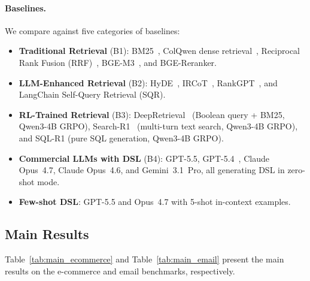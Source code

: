 \documentclass[11pt]{article}
\begin{document}
\paragraph{Baselines.}
We compare against five categories of baselines:

\begin{itemize}[leftmargin=*,nosep]
\item \textbf{Traditional Retrieval} (B1): BM25~\cite{robertson2009probabilistic}, ColQwen dense retrieval~\cite{chen2024colqwen}, Reciprocal Rank Fusion (RRF)~\cite{cormack2009reciprocal}, BGE-M3~\cite{chen2024bge}, and BGE-Reranker.
\item \textbf{LLM-Enhanced Retrieval} (B2): HyDE~\cite{gao2023precise}, IRCoT~\cite{trivedi2023interleaving}, RankGPT~\cite{sun2023chatgpt}, and LangChain Self-Query Retrieval (SQR).
\item \textbf{RL-Trained Retrieval} (B3): DeepRetrieval~\cite{jiang2025deepretrieval} (Boolean query + BM25, Qwen3-4B GRPO), Search-R1~\cite{jin2025search} (multi-turn text search, Qwen3-4B GRPO), and SQL-R1 (pure SQL generation, Qwen3-4B GRPO).
\item \textbf{Commercial LLMs with DSL} (B4): GPT-5.5, GPT-5.4~\cite{openai2025gpt5}, Claude Opus~4.7, Claude Opus~4.6, and Gemini~3.1~Pro, all generating DSL in zero-shot mode.
\item \textbf{Few-shot DSL}: GPT-5.5 and Opus~4.7 with 5-shot in-context examples.
\end{itemize}


\subsection{Main Results}
\label{sec:main_results}

Table~\ref{tab:main_ecommerce} and Table~\ref{tab:main_email} present the main results on the e-commerce and email benchmarks, respectively.
\end{document}
